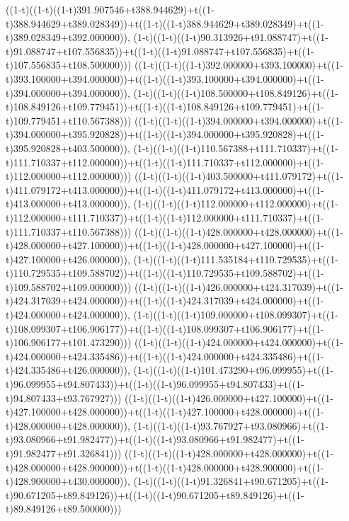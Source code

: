 ((1-t)((1-t)((1-t)391.907546+t388.944629)+t((1-t)388.944629+t389.028349))+t((1-t)((1-t)388.944629+t389.028349)+t((1-t)389.028349+t392.000000)),                                     (1-t)((1-t)((1-t)90.313926+t91.088747)+t((1-t)91.088747+t107.556835))+t((1-t)((1-t)91.088747+t107.556835)+t((1-t)107.556835+t108.500000)))
((1-t)((1-t)((1-t)392.000000+t393.100000)+t((1-t)393.100000+t394.000000))+t((1-t)((1-t)393.100000+t394.000000)+t((1-t)394.000000+t394.000000)),                                     (1-t)((1-t)((1-t)108.500000+t108.849126)+t((1-t)108.849126+t109.779451))+t((1-t)((1-t)108.849126+t109.779451)+t((1-t)109.779451+t110.567388)))
((1-t)((1-t)((1-t)394.000000+t394.000000)+t((1-t)394.000000+t395.920828))+t((1-t)((1-t)394.000000+t395.920828)+t((1-t)395.920828+t403.500000)),                                     (1-t)((1-t)((1-t)110.567388+t111.710337)+t((1-t)111.710337+t112.000000))+t((1-t)((1-t)111.710337+t112.000000)+t((1-t)112.000000+t112.000000)))
((1-t)((1-t)((1-t)403.500000+t411.079172)+t((1-t)411.079172+t413.000000))+t((1-t)((1-t)411.079172+t413.000000)+t((1-t)413.000000+t413.000000)),                                     (1-t)((1-t)((1-t)112.000000+t112.000000)+t((1-t)112.000000+t111.710337))+t((1-t)((1-t)112.000000+t111.710337)+t((1-t)111.710337+t110.567388)))
((1-t)((1-t)((1-t)428.000000+t428.000000)+t((1-t)428.000000+t427.100000))+t((1-t)((1-t)428.000000+t427.100000)+t((1-t)427.100000+t426.000000)),                                     (1-t)((1-t)((1-t)111.535184+t110.729535)+t((1-t)110.729535+t109.588702))+t((1-t)((1-t)110.729535+t109.588702)+t((1-t)109.588702+t109.000000)))
((1-t)((1-t)((1-t)426.000000+t424.317039)+t((1-t)424.317039+t424.000000))+t((1-t)((1-t)424.317039+t424.000000)+t((1-t)424.000000+t424.000000)),                                     (1-t)((1-t)((1-t)109.000000+t108.099307)+t((1-t)108.099307+t106.906177))+t((1-t)((1-t)108.099307+t106.906177)+t((1-t)106.906177+t101.473290)))
((1-t)((1-t)((1-t)424.000000+t424.000000)+t((1-t)424.000000+t424.335486))+t((1-t)((1-t)424.000000+t424.335486)+t((1-t)424.335486+t426.000000)),                                     (1-t)((1-t)((1-t)101.473290+t96.099955)+t((1-t)96.099955+t94.807433))+t((1-t)((1-t)96.099955+t94.807433)+t((1-t)94.807433+t93.767927)))
((1-t)((1-t)((1-t)426.000000+t427.100000)+t((1-t)427.100000+t428.000000))+t((1-t)((1-t)427.100000+t428.000000)+t((1-t)428.000000+t428.000000)),                                     (1-t)((1-t)((1-t)93.767927+t93.080966)+t((1-t)93.080966+t91.982477))+t((1-t)((1-t)93.080966+t91.982477)+t((1-t)91.982477+t91.326841)))
((1-t)((1-t)((1-t)428.000000+t428.000000)+t((1-t)428.000000+t428.900000))+t((1-t)((1-t)428.000000+t428.900000)+t((1-t)428.900000+t430.000000)),                                     (1-t)((1-t)((1-t)91.326841+t90.671205)+t((1-t)90.671205+t89.849126))+t((1-t)((1-t)90.671205+t89.849126)+t((1-t)89.849126+t89.500000)))
